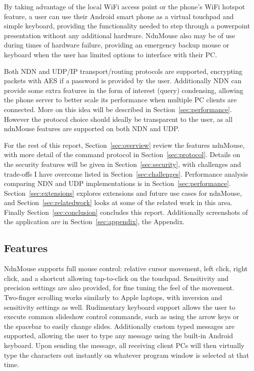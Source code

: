 \documentclass{sig-alternate}
\renewcommand\_{\textunderscore\allowbreak}  %
\begin{document}
By taking advantage of the local WiFi access point or the phone's WiFi hotspot feature, a user can use their Android smart phone as a virtual touchpad and simple keyboard, providing the functionality needed to step through a powerpoint presentation without any additional hardware. NdnMouse also may be of use during times of hardware failure, providing an emergency backup mouse or keyboard when the user has limited options to interface with their PC.

Both NDN and UDP/IP transport/routing protocols are supported, encrypting packets with AES if a password is provided by the user. Additionally NDN can provide some extra features in the form of interest (query) condensing, allowing the phone server to better scale its performance when multiple PC clients are connected. More on this idea will be described in Section~\ref{sec:performance}. However the protocol choice should ideally be transparent to the user, as all ndnMouse features are supported on both NDN and UDP.

For the rest of this report, Section~\ref{sec:overview} review the features ndnMouse, with more detail of the command protocol in Section~\ref{sec:protocol}. Details on the security features will be given in Section~\ref{sec:security}, with challenges and trade-offs I have overcome listed in Section~\ref{sec:challenges}. Performance analysis comparing NDN and UDP implementations is in Section~\ref{sec:performance}. Section~\ref{sec:extensions} explores extensions and future use cases for ndnMouse, and Section~\ref{sec:relatedwork} looks at some of the related work in this area. Finally Section~\ref{sec:conclusion} concludes this report. Additionally screenshots of the application are in Section~\ref{sec:appendix}, the Appendix.

\subsection{Features}
NdnMouse supports full mouse control: relative cursor movement, left click, right click, and a shortcut allowing tap-to-click on the touchpad. Sensitivity and precision settings are also provided, for fine tuning the feel of the movement. Two-finger scrolling works similarly to Apple laptops, with inversion and sensitivity settings as well. Rudimentary keyboard support allows the user to execute common slideshow control commands, such as using the arrow keys or the spacebar to easily change slides. Additionally custom typed messages are supported, allowing the user to type any message using the built-in Android keyboard. Upon sending the message, all receiving client PCs will then virtually type the characters out instantly on whatever program window is selected at that time.
\end{document}
